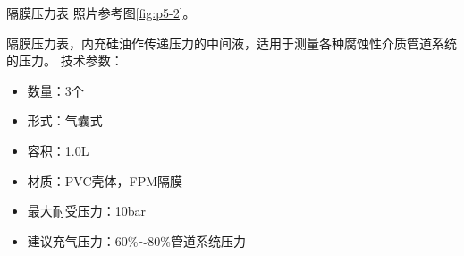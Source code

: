 
%
%
%

\par 隔膜压力表 照片参考图\ref{fig:p5-2}。
\par 隔膜压力表，内充硅油作传递压力的中间液，适用于测量各种腐蚀性介质管道系统的压力。
技术参数：
\begin{itemize}
    \item 数量：3个
    \item 形式：气囊式
    \item 容积：1.0L
    \item 材质：PVC壳体，FPM隔膜
    \item 最大耐受压力：10bar
    \item 建议充气压力：60\%$\sim$80\%管道系统压力
\end{itemize}

